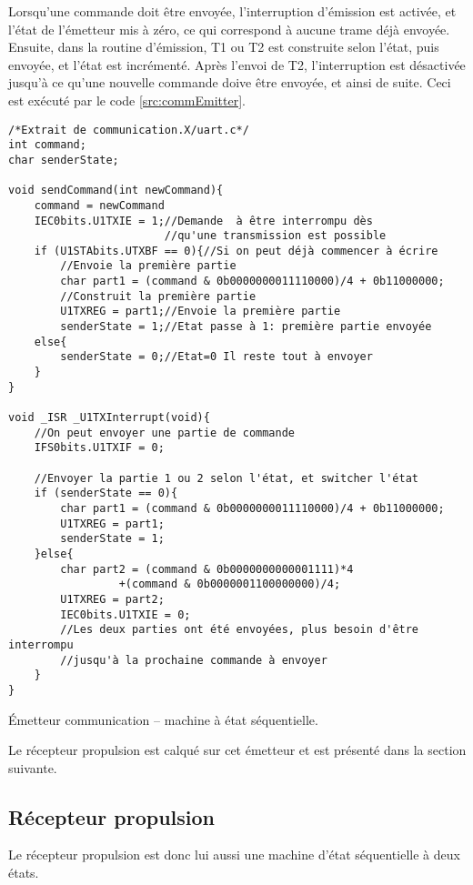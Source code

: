 Lorsqu'une commande doit être envoyée, l'interruption d'émission est activée, et l'état de l'émetteur mis à zéro, ce qui correspond à aucune trame déjà envoyée. Ensuite, dans la routine d'émission, T1 ou T2 est construite selon l'état, puis envoyée, et l'état est incrémenté. Après l'envoi de T2, l'interruption est désactivée jusqu'à ce qu'une nouvelle commande doive être envoyée, et ainsi de suite. Ceci est exécuté par le code \ref{src:commEmitter}.
\begin{listing}[htbp]
\begin{verbatim}
/*Extrait de communication.X/uart.c*/
int command;
char senderState;

void sendCommand(int newCommand){
    command = newCommand
    IEC0bits.U1TXIE = 1;//Demande  à être interrompu dès
                        //qu'une transmission est possible
    if (U1STAbits.UTXBF == 0){//Si on peut déjà commencer à écrire
        //Envoie la première partie
        char part1 = (command & 0b0000000011110000)/4 + 0b11000000;
        //Construit la première partie
        U1TXREG = part1;//Envoie la première partie
        senderState = 1;//Etat passe à 1: première partie envoyée
    else{
        senderState = 0;//Etat=0 Il reste tout à envoyer
    }
}

void _ISR _U1TXInterrupt(void){
    //On peut envoyer une partie de commande
    IFS0bits.U1TXIF = 0;

    //Envoyer la partie 1 ou 2 selon l'état, et switcher l'état
    if (senderState == 0){
        char part1 = (command & 0b0000000011110000)/4 + 0b11000000;
        U1TXREG = part1;
        senderState = 1;
    }else{
        char part2 = (command & 0b0000000000001111)*4
                 +(command & 0b0000001100000000)/4;
        U1TXREG = part2;
        IEC0bits.U1TXIE = 0;
        //Les deux parties ont été envoyées, plus besoin d'être interrompu
        //jusqu'à la prochaine commande à envoyer
    }
}
\end{verbatim}
\caption{\'Emetteur communication -- machine à état séquentielle.\label{src:commEmitter}}
\end{listing}

Le récepteur propulsion est calqué sur cet émetteur et est présenté dans la section suivante.

\subsection{Récepteur propulsion\label{subsec:propReceptor}}
Le récepteur propulsion est donc lui aussi une machine d'état séquentielle à deux états.

